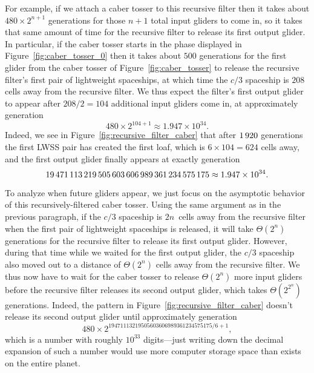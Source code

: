 For example, if we attach a caber tosser to this recursive filter then it takes about $480 \times 2^{n+1}$ generations for those $n+1$ total input gliders to come in, so it takes that same amount of time for the recursive filter to release its first output glider. In particular, if the caber tosser starts in the phase displayed in Figure~\ref{fig:caber_tosser_0} then it takes about $500$ generations for the first glider from the caber tosser of Figure~\ref{fig:caber_tosser} to release the recursive filter's first pair of lightweight spaceships, at which time the $c/3$ spaceship is $208$ cells away from the recursive filter. We thus expect the filter's first output glider to appear after $208/2 = 104$ additional input gliders come in, at approximately generation
\[
	480 \times 2^{104 + 1} \approx 1.947 \times 10^{34}.
\]
Indeed, we see in Figure~\ref{fig:recursive_filter_caber} that after $1{\,}920$ generations the first LWSS pair has created the first loaf, which is $6 \times 104 = 624$ cells away, and the first output glider finally appears at exactly generation
\[
	19{\,}471{\,}113{\,}219{\,}505{\,}603{\,}606{\,}989{\,}361{\,}234{\,}575{\,}175 \approx 1.947 \times 10^{34}.
\]

To analyze when future gliders appear, we just focus on the asymptotic behavior of this recursively-filtered caber tosser. Using the same argument as in the previous paragraph, if the $c/3$ spaceship is $2n$~cells away from the recursive filter when the first pair of lightweight spaceships is released, it will take $\Theta(2^n)$ generations for the recursive filter to release its first output glider. However, during that time while we waited for the first output glider, the $c/3$ spaceship also moved out to a distance of $\Theta(2^n)$ cells away from the recursive filter. We thus now have to wait for the caber tosser to release $\Theta(2^n)$ more input gliders before the recursive filter releases its second output glider, which takes $\Theta(2^{2^n})$ generations. Indeed, the pattern in Figure~\ref{fig:recursive_filter_caber} doesn't release its second output glider until approximately generation
\[
	480 \times 2^{19471113219505603606989361234575175/6 + 1},
\]
which is a number with roughly $10^{33}$ digits---just writing down the decimal expansion of such a number would use more computer storage space than exists on the entire planet.

